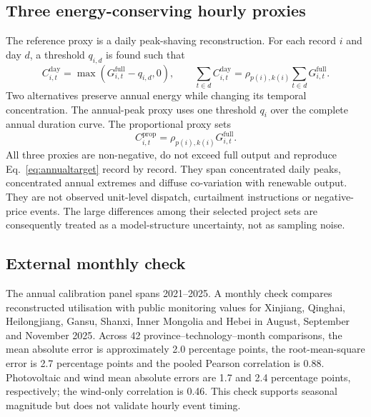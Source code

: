 \documentclass[pdflatex,sn-nature]{sn-jnl}
\begin{document}
\subsection{Three energy-conserving hourly proxies}

The reference proxy is a daily peak-shaving reconstruction. For each record $i$ and day $d$, a threshold $q_{i,d}$ is found such that
\begin{equation}
C^{\mathrm{day}}_{i,t}=\max\left(G^{\mathrm{full}}_{i,t}-q_{i,d},0\right), \qquad
\sum_{t\in d}C^{\mathrm{day}}_{i,t}=\rho_{p(i),k(i)}\sum_{t\in d}G^{\mathrm{full}}_{i,t}.
\label{eq:dailypeak}
\end{equation}
Two alternatives preserve annual energy while changing its temporal concentration. The annual-peak proxy uses one threshold $q_i$ over the complete annual duration curve. The proportional proxy sets
\begin{equation}
C^{\mathrm{prop}}_{i,t}=\rho_{p(i),k(i)}G^{\mathrm{full}}_{i,t}.
\label{eq:proportional}
\end{equation}
All three proxies are non-negative, do not exceed full output and reproduce Eq.~\ref{eq:annualtarget} record by record. They span concentrated daily peaks, concentrated annual extremes and diffuse co-variation with renewable output. They are not observed unit-level dispatch, curtailment instructions or negative-price events. The large differences among their selected project sets are consequently treated as a model-structure uncertainty, not as sampling noise.

\subsection{External monthly check}

The annual calibration panel spans 2021--2025\cite{renewableannual,renewable2025}. A monthly check compares reconstructed utilisation with public monitoring values for Xinjiang, Qinghai, Heilongjiang, Gansu, Shanxi, Inner Mongolia and Hebei in August, September and November 2025\cite{renewablemonthly}. Across 42 province--technology--month comparisons, the mean absolute error is approximately 2.0 percentage points, the root-mean-square error is 2.7 percentage points and the pooled Pearson correlation is 0.88. Photovoltaic and wind mean absolute errors are 1.7 and 2.4 percentage points, respectively; the wind-only correlation is 0.46. This check supports seasonal magnitude but does not validate hourly event timing.
\end{document}
